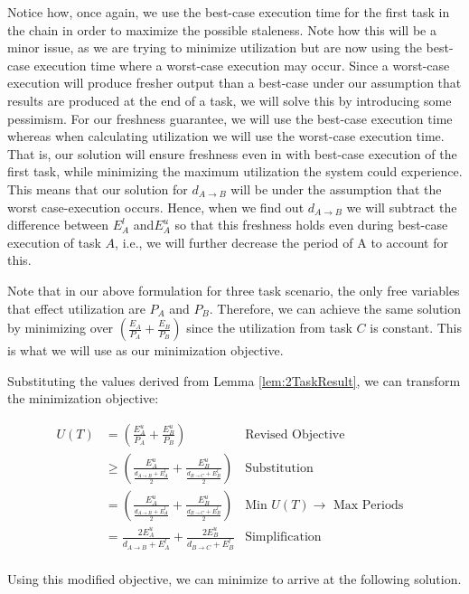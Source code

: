 Notice how, once again, we use the best-case execution time for the first task in the chain in order to maximize the possible staleness. Note how this will be a minor issue, as we are trying to minimize utilization but are now using the best-case execution time where a worst-case execution may occur. Since a worst-case execution will produce fresher output than a best-case under our assumption that results are produced at the end of a task, we will solve this by introducing some pessimism. For our freshness guarantee, we will use the best-case execution time whereas when calculating utilization we will use the worst-case execution time. That is, our solution will ensure freshness even in with best-case execution of the first task, while minimizing the maximum utilization the system could experience. This means that our solution for $d_{A \to B}$ will be under the assumption that the worst case-execution occurs. Hence, when we find out $d_{A \to B}$ we will subtract the difference between $E^l_A$ and$E^u_A$ so that this freshness holds even during best-case execution of task $A$, i.e., we will further decrease the period of A to account for this.

Note that in our above formulation for three task scenario, the only free variables that effect utilization are $P_A$ and $P_B$. Therefore, we can achieve the same solution by minimizing over $\left(\frac{E_A}{P_A} + \frac{E_B}{P_B}\right)$ since the utilization from task $C$ is constant. This is what we will use as our minimization objective.

Substituting the values derived from Lemma \ref{lem:2TaskResult}, we can transform the minimization objective:

\begin{align*}
	U(T) &= \left(\frac{E^u_A}{P_A} + \frac{E^u_B}{P_B}\right) &\mbox{Revised Objective}&\\
	&\geq \left(\frac{E^u_A}{\frac{d_{A \to B} + E^l_A}{2}} + \frac{E^u_B}{\frac{d_{B \to C} + E^l_B}{2}}\right) &\mbox{Substitution}&\\
	&= \left(\frac{E^u_A}{\frac{d_{A \to B} + E^l_A}{2}} + \frac{E^u_B}{\frac{d_{B \to C} + E^l_B}{2}}\right) &\mbox{Min $U(T) \to$ Max Periods}&\\
	&= \frac{2E^u_A}{d_{A \to B}+E^l_A} + \frac{2E^u_B}{d_{B \to C}+E^l_B} &\mbox{Simplification}&\\
\end{align*}

Using this modified objective, we can minimize to arrive at the following solution.

